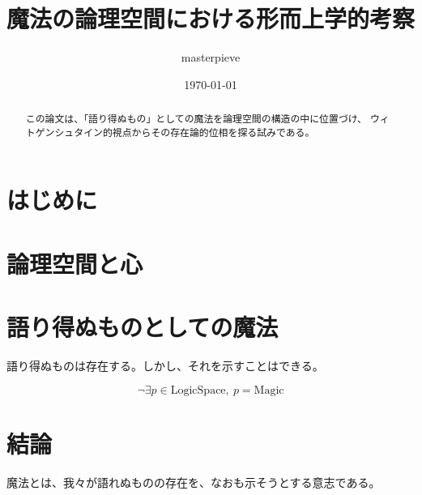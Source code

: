 \documentclass[12pt]{article}
\title{魔法の論理空間における形而上学的考察}
\author{masterpieve}
\date{\today}
\begin{document}
\maketitle

\begin{abstract}
この論文は、「語り得ぬもの」としての魔法を論理空間の構造の中に位置づけ、
ウィトゲンシュタイン的視点からその存在論的位相を探る試みである。
\end{abstract}

\section{はじめに}


\section{論理空間と心}


\section{語り得ぬものとしての魔法}
語り得ぬものは存在する。しかし、それを示すことはできる。

\[
  \neg \exists p \in \text{LogicSpace},\ p = \text{Magic}
\]

\section{結論}
魔法とは、我々が語れぬものの存在を、なおも示そうとする意志である。
\end{document}
